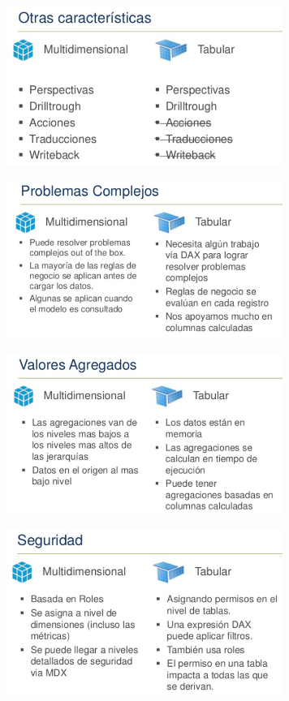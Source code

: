 \documentclass[%
 reprint,
 amsmath,amssymb,
 aps,
]{revtex4-1}
\begin{document}
\begin{center}
	\includegraphics[width=9cm]{./Imagenes/4}
\end{center}
\begin{center}
	\includegraphics[width=9cm]{./Imagenes/5}
\end{center}
\begin{center}
	\includegraphics[width=9cm]{./Imagenes/6}
\end{center}
\begin{center}
	\includegraphics[width=9cm]{./Imagenes/7}
\end{center}
\end{document}
